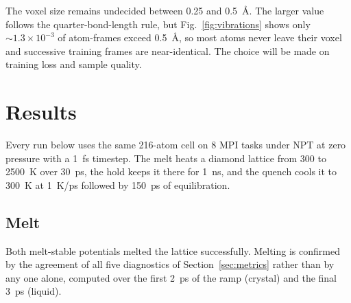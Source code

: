 \documentclass{article}
\begin{document}
The voxel size remains undecided between 0.25 and 0.5~\AA. The larger value follows the quarter-bond-length rule, but Fig.~\ref{fig:vibrations} shows only $\sim1.3\times10^{-3}$ of atom-frames exceed 0.5~\AA, so most atoms never leave their voxel and successive training frames are near-identical. The choice will be made on training loss and sample quality.

\clearpage
\section{Results}

Every run below uses the same 216-atom cell on 8 MPI tasks under NPT at zero pressure with a 1~fs timestep. The melt heats a diamond lattice from 300 to 2500~K over 30~ps, the hold keeps it there for 1~ns, and the quench cools it to 300~K at 1~K/ps followed by 150~ps of equilibration.

\subsection{Melt}

Both melt-stable potentials melted the lattice successfully. Melting is confirmed by the agreement of all five diagnostics of Section~\ref{sec:metrics} rather than by any one alone, computed over the first 2~ps of the ramp (crystal) and the final 3~ps (liquid).
\end{document}
